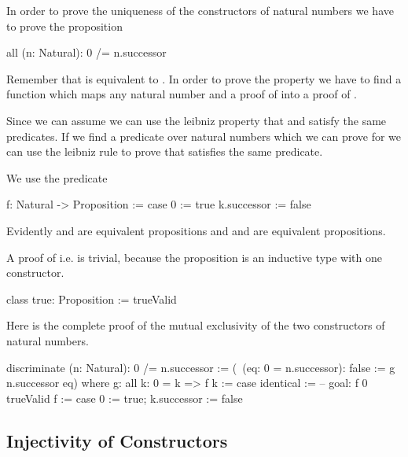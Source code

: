 In order to prove the uniqueness of the constructors of natural numbers we have
to prove the proposition

\begin{alba}
    all (n: Natural): 0 /= n.successor
\end{alba}

Remember that  is equivalent to . In order to prove the property we have to find a function which
maps any natural number  and a proof of  into a
proof of .

Since we can assume  we can use the leibniz property that
 and  satisfy the same predicates. If we find a
predicate over natural numbers which we can prove for  we can use the
leibniz rule to prove that  satisfies the same predicate.

We use the predicate
\begin{alba}
    f: Natural -> Proposition :=
        case
            0 :=
                true
            k.successor :=
                false
\end{alba}

Evidently  and  are equivalent propositions and  and  are equivalent propositions.

A proof of  i.e.  is trivial, because the proposition
 is an inductive type with one constructor.

\begin{alba}
    class true: Proposition := trueValid
\end{alba}


Here is the complete proof of the mutual exclusivity of the two constructors of
natural numbers.


\begin{alba}
    discriminate (n: Natural): 0 /= n.successor
    :=
        (\ (eq: 0 = n.successor): false := g n.successor eq)
        where
            g: all k: 0 = k => f k :=
                case
                    identical :=
                        -- goal: f 0
                        trueValid
            f :=
                case 0 := true; k.successor := false
\end{alba}





\subsection{Injectivity of Constructors}

